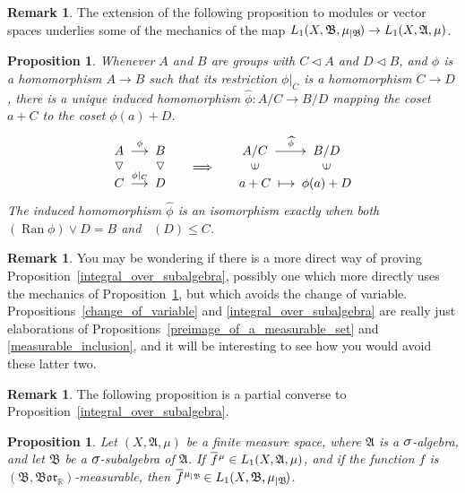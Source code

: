 \documentclass[
twoside=true,
paper=letter,
fontsize=9pt,
pagesize=auto,
leqno,
openany,
headsepline,
overfullrule,
]{scrbook}
\theoremstyle{plain}
\theoremstyle{plain}
\newtheorem{prop}[thm]{Proposition}
\theoremstyle{definition}
\newtheorem{rmk}[thm]{Remark}
\theoremstyle{bfnoteitalic}
\theoremstyle{bfnoteroman}
\newcommand{\sigalg}[1]{\mathfrak{#1}}
\newcommand{\normalin}{\vartriangleleft}
\newcommand{\normalup}{\rotatebox{90}{$\normalin$}}
\newcommand{\elementup}{\rotatebox{90}{$\in$}}
\DeclareMathOperator{\range}{Ran}
\newcommand{\borel}{\mathfrak{Bor}}
\newcommand{\textsigma}{\hbox{\large{$\sigma$}}\kern-1pt}
\newcommand{\restrictedto}[1]{_{\lvert#1}\kern-1.5pt}
\newcommand{\preimage}[1]{\mathop{#1^{\leftarrow}}}
\newcommand{\R}{\mathbb{R}}
\newcommand{\sigmaalgebra}{\sigalg{A}}
\newcommand{\sigmaalgebraii}{\sigalg{B}}
\newcommand{\measurespace}{X}
\newcommand{\measure}{\mu}
\newcommand*\xbar[1]{%
   \hbox{%
     \vbox{%
       \hrule height 0.4pt %
       \kern0.4ex%
       \hbox{%
         \ensuremath{#1}%
       }%
     }%
   }%
}
\newcommand{\lebclass}[1]{\hspace{.5pt}\xbar{#1}\hspace{0.5pt}}
\newcommand{\ellclass}[2]{\lebclass{#1}^{#2}}
\begin{document}
\begin{rmk}
The extension of the following proposition to modules or vector spaces underlies some of the mechanics of the map
$L_1(\measurespace, \sigmaalgebraii, \measure\restrictedto{\sigmaalgebraii})
\to
L_1(\measurespace, \sigmaalgebra, \measure)$.
\end{rmk}


\begin{prop}\label{induced_quotient_homomorphism}
Whenever $A$ and $B$ are groups with $C\normalin A$ and $D\normalin B$, and $\phi$ is a homomorphism ${A\to B}$ such that its restriction $\phi\vert_C$ is a homomorphism $C\to D$, there is a unique induced homomorphism ${\widehat \phi :A/C\to B/D}$ mapping the coset $a+C$ to the coset $\phi(a)+D$. 
\[
\xymatrix@R=-2pt@C=12pt{
\ A\  \ar[r]^{\phi} & \ B\  & & \ A/C\ \ar[r]^{\widehat \phi} & \ B/D\ \\
\normalup & \normalup & \Longrightarrow & \elementup & \elementup \\
\ C\ \ar[r]^{\phi\vert_C} & \ D\  & & \ a+C\ \ar@{|->}[r] & \ \phi(a)+D\ }
\]
The induced homomorphism $\widehat \phi$ is an isomorphism exactly when both  $(\range \phi) \vee D = B$ and $\preimage{\phi}(D)\leq C$. 
\end{prop}

\begin{rmk}
You may be wondering if there is a more direct way of proving Proposition~\ref{integral_over_subalgebra}, possibly one which more directly uses the mechanics of Proposition~\ref{induced_quotient_homomorphism}, but which avoids the change of variable.  
Propositions~\ref{change_of_variable} and \ref{integral_over_subalgebra} are really just elaborations of Propositions~\ref{preimage_of_a_measurable_set} and \ref{measurable_inclusion}, and it will be interesting to see how you would avoid these latter two.
\end{rmk}








\begin{rmk}
The following proposition is a partial converse to Proposition~\ref{integral_over_subalgebra}.
\end{rmk}


\begin{prop}\label{algebra_to_subalgebra}
Let $(\measurespace, \sigmaalgebra, \measure)$ be a finite measure space, where $\sigmaalgebra$ is a $\textsigma$-algebra, and let $\sigmaalgebraii$ be a $\textsigma$-subalgebra of $\sigmaalgebra$. 
If $\ellclass{f}{\measure} 
\in L_1(\measurespace, \sigmaalgebra, \measure)$, and if the function $f$ is $(\sigmaalgebraii, \borel_\R)$\hyp{}measurable, then
$\ellclass{f}{\measure\restrictedto{\sigmaalgebraii}}
\in L_1(\measurespace, \sigmaalgebraii, \measure\restrictedto{\sigmaalgebraii})$.
\end{prop}
\end{document}
